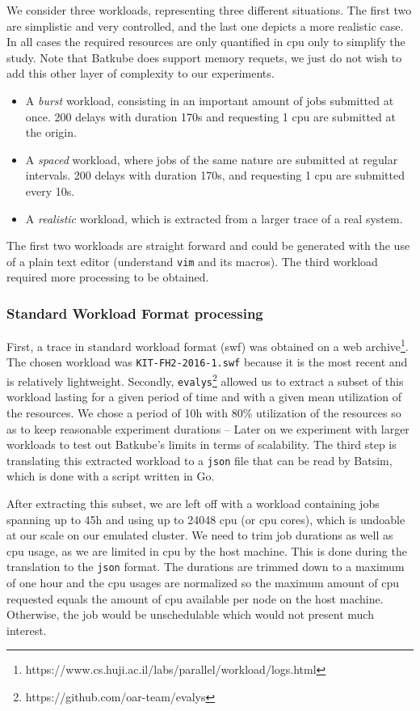 We consider three workloads, representing three different situations. The first
two are simplistic and very controlled, and the last one depicts a more
realistic case. In all cases the required resources are only quantified in cpu
only to simplify the study. Note that Batkube does support memory requets, we
just do not wish to add this other layer of complexity to our experiments.

\begin{itemize}
	\item A \textit{burst} workload, consisting in an important amount of
		jobs submitted at once.  200 delays with duration 170s and
		requesting 1 cpu are submitted at the origin.
	\item A \textit{spaced} workload, where jobs of the same nature are
		submitted at regular intervals.  200 delays with duration 170s,
		and requesting 1 cpu are submitted every 10s.
	\item A \textit{realistic} workload, which is extracted from a larger
		trace of a real system.
\end{itemize}

The first two workloads are straight forward and could be generated with the
use of a plain text editor (understand \texttt{vim} and its macros). The third
workload required more processing to be obtained.  

\subsubsection{Standard Workload Format processing}

First, a trace in standard
workload format (swf) was obtained on a web
archive\footnote{https://www.cs.huji.ac.il/labs/parallel/workload/logs.html}.
The chosen workload was \texttt{KIT-FH2-2016-1.swf} because it is the most
recent and is relatively lightweight. Secondly,
\texttt{evalys}\footnote{https://github.com/oar-team/evalys} allowed us to
extract a subset of this workload lasting for a given period of time and with a
given mean utilization of the resources. We chose a period of 10h with 80\%
utilization of the resources so as to keep reasonable experiment durations --
Later on we experiment with larger workloads to test out Batkube's limits in
terms of scalability.  The third step is translating this extracted workload to
a \texttt{json} file that can be read by Batsim, which is done with a script
written in Go.

After extracting this subset, we are left off with a workload containing jobs
spanning up to 45h and using up to 24048 cpu (or cpu cores), which is undoable
at our scale on our emulated cluster. We need to trim job durations as well as
cpu usage, as we are limited in cpu by the host machine. This is done during
the translation to the \texttt{json} format. The durations are trimmed down to
a maximum of one hour and the cpu usages are normalized so the maximum amount
of cpu requested equals the amount of cpu available per node on the host
machine. Otherwise, the job would be unschedulable which would not present much
interest.

